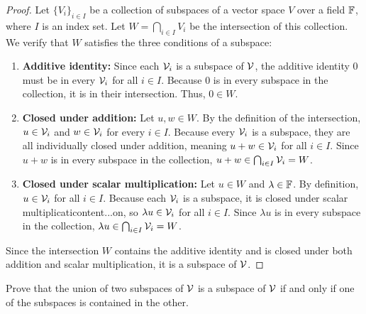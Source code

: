 \begin{proof}
	Let $\{V_i\}_{i \in I}$ be a collection of subspaces of a vector space $V$ over a field $\mathbb{F}$, where $I$ is an index set. Let $W = \bigcap_{i \in I} V_i$ be the intersection of this collection. We verify that $W$ satisfies the three conditions of a subspace:
	
	\begin{enumerate}
		\item \textbf{Additive identity:} Since each $\mathcal{V}_i$ is a subspace of $\mathcal{V}$, the additive identity $0$ must be in every $\mathcal{V}_i$ for all $i \in I$. Because $0$ is in every subspace in the collection, it is in their intersection. Thus, $0 \in W$.
		
		\item \textbf{Closed under addition:} Let $u, w \in W$. By the definition of the intersection, $u \in \mathcal{V}_i$ and $w \in \mathcal{V}_i$ for every $i \in I$. Because every $\mathcal{V}_i$ is a subspace, they are all individually closed under addition, meaning $u + w \in \mathcal{V}_i$ for all $i \in I$. Since $u + w$ is in every subspace in the collection, $u + w \in \bigcap_{i \in I} \mathcal{V}_i = W$.
		
		\item \textbf{Closed under scalar multiplication:} Let $u \in W$ and $\lambda \in \mathbb{F}$. By definition, $u \in \mathcal{V}_i$ for all $i \in I$. Because each $\mathcal{V}_i$ is a subspace, it is closed under scalar multiplicaticontent...on, so $\lambda u \in \mathcal{V}_i$ for all $i \in I$. Since $\lambda u$ is in every subspace in the collection, $\lambda u \in \bigcap_{i \in I} \mathcal{V}_i = W$.
	\end{enumerate}
	
	Since the intersection $W$ contains the additive identity and is closed under both addition and scalar multiplication, it is a subspace of $\mathcal{V}$.
\end{proof}
\begin{question}
	Prove that the union of two subspaces of $\mathcal{V}$ is a subspace of $\mathcal{V}$ if and only if one of the subspaces is contained in the other.
\end{question}
